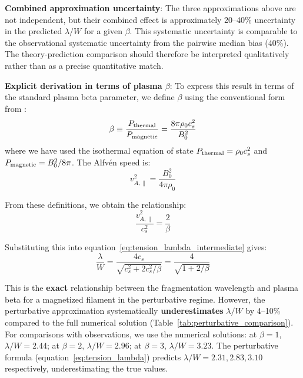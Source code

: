 \documentclass[11pt,a4paper]{article}
\begin{document}
\textbf{Combined approximation uncertainty}: The three approximations above are not independent, but their combined effect is approximately 20--40\% uncertainty in the predicted $\lambda/W$ for a given $\beta$. This systematic uncertainty is comparable to the observational systematic uncertainty from the pairwise median bias (40\%). The theory-prediction comparison should therefore be interpreted qualitatively rather than as a precise quantitative match.

\textbf{Explicit derivation in terms of plasma $\beta$}: To express this result in terms of the standard plasma beta parameter, we define $\beta$ using the conventional form from \citet{Crutcher2012}:
\begin{equation}
\beta \equiv \frac{P_{\rm thermal}}{P_{\rm magnetic}} = \frac{8\pi\rho_0 c_s^2}{B_0^2}
\end{equation}
where we have used the isothermal equation of state $P_{\rm thermal} = \rho_0 c_s^2$ and $P_{\rm magnetic} = B_0^2/8\pi$. The Alfv\'en speed is:
\begin{equation}
v_{A,\parallel}^2 = \frac{B_0^2}{4\pi\rho_0}
\end{equation}

From these definitions, we obtain the relationship:
\begin{equation}
\frac{v_{A,\parallel}^2}{c_s^2} = \frac{2}{\beta}
\end{equation}

Substituting this into equation~\ref{eq:tension_lambda_intermediate} gives:
\begin{equation}
\frac{\lambda}{W} = \frac{4c_s}{\sqrt{c_s^2 + 2c_s^2/\beta}} = \frac{4}{\sqrt{1 + 2/\beta}}
\label{eq:tension_lambda}
\end{equation}

This is the \textbf{exact} relationship between the fragmentation wavelength and plasma beta for a magnetized filament in the perturbative regime. However, the perturbative approximation systematically \textbf{underestimates} $\lambda/W$ by 4--10\% compared to the full numerical solution (Table~\ref{tab:perturbative_comparison}). For comparisons with observations, we use the numerical solutions: at $\beta = 1$, $\lambda/W = 2.44$; at $\beta = 2$, $\lambda/W = 2.96$; at $\beta = 3$, $\lambda/W = 3.23$. The perturbative formula (equation~\ref{eq:tension_lambda}) predicts $\lambda/W = 2.31, 2.83, 3.10$ respectively, underestimating the true values.
\end{document}
